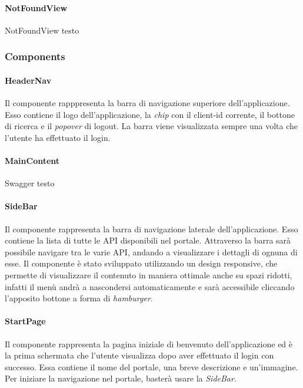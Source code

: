 \paragraph{NotFoundView}\label{par:not-found-view}
NotFoundView testo


\subsubsection{Components}\label{subsubsec:components}

\paragraph{HeaderNav}\label{par:header-nav}
Il componente rapppresenta la barra di navigazione superiore dell'applicazione. Esso contiene il logo dell'applicazione, la \textit{chip} con il client-id
corrente, il bottone di ricerca e il \textit{popover} di logout. 
La barra viene visualizzata sempre una volta che l'utente ha effettuato il login.\\

\paragraph{MainContent}\label{par:main-content}
Swagger testo

\paragraph{SideBar}\label{par:side-bar}
Il componente rappresenta la barra di navigazione laterale dell'applicazione. Esso contiene la lista di tutte le API disponibili nel portale.
Attraverso la barra sarà possibile navigare tra le varie API, andando a visualizzare i dettagli di ognuna di esse. 
Il componente è stato sviluppato utilizzando un design responsive, che permette di visualizzare il contenuto in maniera ottimale anche su spazi ridotti, 
infatti il menù andrà a nascondersi automaticamente e sarà accessibile cliccando l'apposito bottone a forma di \textit{hamburger}.\\


\paragraph{StartPage}\label{par:start-page}
Il componente rappresenta la pagina iniziale di benvenuto dell'applicazione ed è la prima schermata che l'utente visualizza dopo aver effettuato il login con successo.
Essa contiene il nome del portale, una breve descrizione e un'immagine. Per iniziare la navigazione nel portale, basterà usare la \textit{SideBar}.

